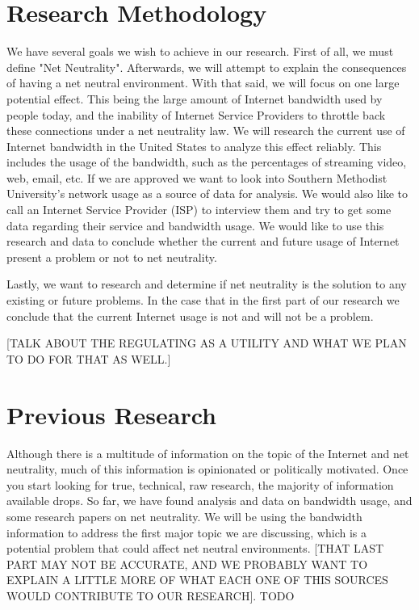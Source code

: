 \documentclass{sigcomm-alternate}
\begin{document}
     		
\section{Research Methodology}
We have several goals we wish to achieve in our research. First of all, we must define "Net Neutrality". Afterwards, we will attempt to explain the consequences of having a net neutral environment. With that said, we will focus on one large potential effect. This being the large amount of Internet bandwidth used by people today, and the inability of Internet Service Providers to throttle back these connections under a net neutrality law. We will research the current use of Internet bandwidth in the United States to analyze this effect reliably. This includes the usage of the bandwidth, such as the percentages of streaming video, web, email, etc. If we are approved we want to look into Southern Methodist University's network usage as a source of data for analysis. We would also like to call an Internet Service Provider (ISP) to interview them and try to get some data regarding their service and bandwidth usage. We would like to use this research and data to conclude whether the current and future usage of Internet present a problem or not to net neutrality.  

Lastly, we want to research and determine if net neutrality is the solution to any existing or future problems. In the case that in the first part of our research we conclude that the current Internet usage is not and will not be a problem.

[TALK ABOUT THE REGULATING AS A UTILITY AND WHAT WE PLAN TO DO FOR THAT AS WELL.]

\section{Previous Research}
Although there is a multitude of information on the topic of the Internet and net neutrality, much of this information is opinionated or politically motivated. Once you start looking for true, technical, raw research, the majority of information available drops. So far, we have found analysis and data on bandwidth usage, and some research papers on net neutrality. We will be using the bandwidth information to address the first major topic we are discussing, which is a potential problem that could affect net neutral environments. [THAT LAST PART MAY NOT BE ACCURATE, AND WE PROBABLY WANT TO EXPLAIN A LITTLE MORE OF WHAT EACH ONE OF THIS SOURCES WOULD CONTRIBUTE TO OUR RESEARCH].
TODO
\cite{Jain:2002:EAB:633025.633054}
\cite{Strauss:2003:MSA:948205.948211}
\cite{6040472}
\cite{1224454}
\cite{1631969}
\cite{4042627}
\cite{4542264}
\cite{5188801}
\cite{5235365}
\cite{5277804}
\cite{5579492}
\cite{6040472}
\cite{6649228}
\cite{6980400}
\end{document}
